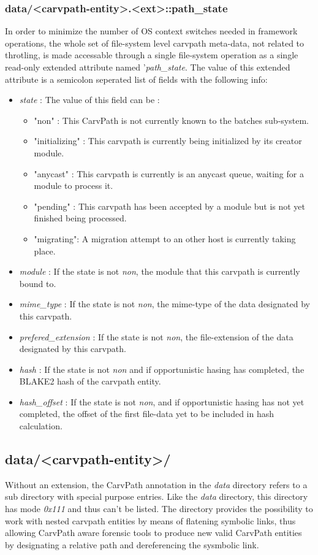 \subsubsection{data/<carvpath-entity>.<ext>::path\_state}
In order to minimize the number of OS context switches needed in framework operations, the whole set of file-system level carvpath meta-data, not related to throtling, is made accessable through a single file-system operation as a single read-only extended attribute named '\emph{path\_state}. The value of this extended attribute is a semicolon seperated list of fields with the following info:
\begin{itemize}
\item \emph{state} : The value of this field can be :
\begin{itemize}
\item "non" : This CarvPath is not currently known to the batches sub-system. 
\item "initializing" : This carvpath is currently being initialized by its creator module.
\item "anycast" : This carvpath is currently is an anycast queue, waiting for a module to process it.
\item "pending" : This carvpath has been accepted by a module but is not yet finished being processed.
\item "migrating": A migration attempt to an other host is currently taking place.
\end{itemize}
\item \emph{module} : If the state is not \emph{non}, the module that this carvpath is currently bound to.
\item \emph{mime\_type} : If the state is not \emph{non}, the mime-type of the data designated by this carvpath.
\item \emph{prefered\_extension} : If the state is not \emph{non}, the file-extension of the data designated by this carvpath.
\item \emph{hash} : If the state is not \emph{non} and if opportunistic hasing has completed, the BLAKE2 hash of the carvpath entity.
\item \emph{hash\_offset} : If the state is not \emph{non}, and if opportunistic hasing has not yet completed, the offset of the first file-data yet to be included in hash calculation.
\end{itemize}
\subsection{data/<carvpath-entity>/}
Without an extension, the CarvPath annotation in the \emph{data} directory refers to a sub directory with special purpose entries. Like the \emph{data} directory, this directory has mode \emph{0x111} and thus can't be listed. The directory provides the possibility to work with nested carvpath entities by means of flatening symbolic links, thus allowing CarvPath aware forensic tools to produce new valid CarvPath entities by designating a relative path and dereferencing the sysmbolic link.
